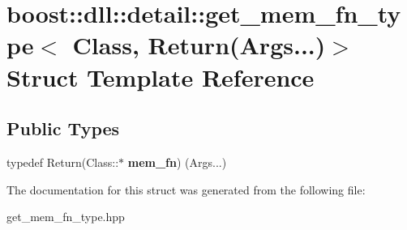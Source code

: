 \hypertarget{a00132}{}\section{boost\+:\+:dll\+:\+:detail\+:\+:get\+\_\+mem\+\_\+fn\+\_\+type$<$ Class, Return(Args...)$>$ Struct Template Reference}
\label{a00132}
\subsection*{Public Types}
\begin{DoxyCompactItemize}
\item 
typedef Return(Class\+::$\ast$ {\bfseries mem\+\_\+fn}) (Args...)\hypertarget{a00132_a3d6cbb182b6bed192344f19d67769667}{}\label{a00132_a3d6cbb182b6bed192344f19d67769667}

\end{DoxyCompactItemize}


The documentation for this struct was generated from the following file\+:\begin{DoxyCompactItemize}
\item 
get\+\_\+mem\+\_\+fn\+\_\+type.\+hpp\end{DoxyCompactItemize}
